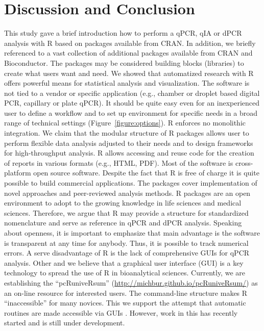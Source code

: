 \section{Discussion and Conclusion}

This study gave a brief introduction how to perform a qPCR, qIA or dPCR analysis 
with R based on packages available from CRAN. In addition, we briefly referenced 
to a vast collection of additional packages available from CRAN and 
Bioconductor. The packages may be considered building blocks (libraries) to 
create what users want and need. We showed that automatized research with R 
offers powerful means for statistical analysis and visualization. The software 
is not tied to a vendor or specific application (e.g., chamber or droplet based 
digital PCR, capillary or plate qPCR). It should be quite easy even for an 
inexperienced user to define a workflow and to set up environment for specific 
needs in a broad range of technical settings (Figure~\ref{figure:options}). R 
enforces no monolithic integration. We claim that the modular structure of R 
packages allows user to perform flexible data analysis adjusted to their needs 
and to design frameworks for high-throughput analysis. R allows accessing and 
reuse code for the creation of reports in various formats (e.g., HTML, PDF). 
Most of the software is cross-platform open source software. Despite the fact 
that R is free of charge it is quite possible to build commercial applications. 
The packages cover implementation of novel approaches and peer-reviewed analysis 
methods. R packages are an open environment to adopt to the growing knowledge in 
life sciences and medical sciences. Therefore, we argue that R may provide a 
structure for standardized nomenclature and serve as reference in qPCR and dPCR 
analysis. Speaking about openness, it is important to emphasize that main 
advantage is the software is transparent at any time for anybody. Thus, it is 
possible to track numerical errors.  A serve disadvantage of R is the lack of 
comprehensive GUIs for qPCR analysis. Other and we believe that a graphical user 
interface (GUI) is a key technology to spread the use of R in bioanalytical 
sciences. Currently, we are establishing the ``pcRuniveRsum'' 
(\url{http://michbur.github.io/pcRuniveRsum/}) as an on-line resource for 
interested users. The command-line structure makes R ``inaccessible'' for many 
novices. This we support the attempt that automatic routines are made accessible 
via GUIs \citep{rodiger_rkward_2012}. However, work in this has recently started 
and is still under development.


